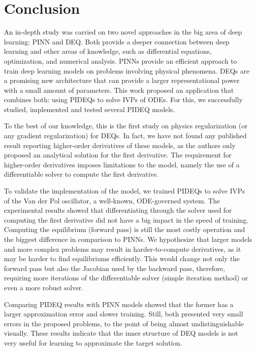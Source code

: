 \chapter{Conclusion}\label{ch:conclusion}

An in-depth study was carried on two novel approaches in the big area of deep learning: \gls{PINN} and {DEQ}.
Both provide a deeper connection between deep learning and other areas of knowledge, such as differential equations, optimization, and numerical analysis.
\gls{PINN}s provide an efficient approach to train deep learning models on problems involving physical phenomena.
\gls{DEQ}s are a promising new architecture that can provide a larger representational power with a small amount of parameters.
This work proposed an application that combines both: using \gls{PIDEQ}s to solve \gls{IVP}s of \gls{ODE}s.
For this, we successfully studied, implemented and tested several \gls{PIDEQ} models.

To the best of our knowledge, this is the first study on physics regularization (or any gradient regularization) for \gls{DEQ}s.
In fact, we have not found any published result reporting higher-order derivatives of these models, as the authors only proposed an analytical solution for the first derivative.
The requirement for higher-order derivatives imposes limitations to the model, namely the use of a differentiable solver to compute the first derivative.

To validate the implementation of the model, we trained \gls{PIDEQ}s to solve \gls{IVP}s of the Van der Pol oscillator, a well-known, \gls{ODE}-governed system.
The experimental results showed that differentiating through the solver used for computing the first derivative did not have a big impact in the speed of training.
Computing the equilibrium (forward pass) is still the most costly operation and the biggest difference in comparison to \gls{PINN}s.
We hypothesize that larger models and more complex problems may result in harder-to-compute derivatives, as it may be harder to find equilibriums efficiently.
This would change not only the forward pass but also the Jacobian used by the backward pass, therefore, requiring more iterations of the differentiable solver (simple iteration method) or even a more robust solver.

Comparing \gls{PIDEQ} results with \gls{PINN} models showed that the former has a larger approximation error and slower training.
Still, both presented very small errors in the proposed problems, to the point of being almost undistinguishable visually.
These results indicate that the inner structure of \gls{DEQ} models is not very useful for learning to approximate the target solution.

